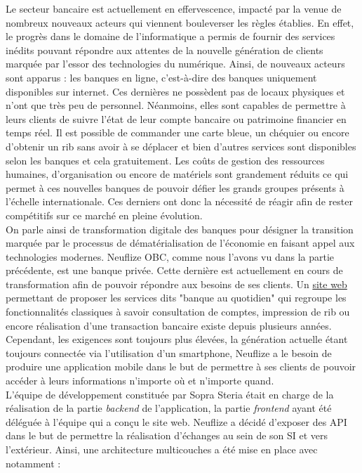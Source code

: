 	Le secteur bancaire est actuellement en effervescence, impacté par la venue de nombreux nouveaux acteurs qui viennent bouleverser les règles établies. En effet, le progrès dans le domaine de l'informatique a permis de fournir des services inédits pouvant répondre aux attentes de la nouvelle génération de clients marquée par l'essor des technologies du numérique. Ainsi, de nouveaux acteurs sont apparus : les banques en ligne, c'est-à-dire des banques uniquement disponibles sur internet. Ces dernières ne possèdent pas de locaux physiques et n'ont que très peu de personnel. Néanmoins, elles sont capables de permettre à leurs clients de suivre l'état de leur compte bancaire ou patrimoine financier en temps réel. Il est possible de commander une carte bleue, un chéquier ou encore d'obtenir un rib sans avoir à se déplacer et bien d'autres services sont disponibles selon les banques et cela gratuitement. Les coûts de gestion des ressources humaines, d'organisation ou encore de matériels sont grandement réduits ce qui permet à ces nouvelles banques de pouvoir défier les grands groupes présents à l'échelle internationale. Ces derniers ont donc la nécessité de réagir afin de rester compétitifs sur ce marché en pleine évolution. \\

	On parle ainsi de transformation digitale des banques pour désigner la transition marquée par le processus de dématérialisation de l'économie en faisant appel aux technologies modernes. Neuflize OBC, comme nous l'avons vu dans la partie précédente, est une banque privée. Cette dernière est actuellement en cours de transformation afin de pouvoir répondre aux besoins de ses clients. Un \href{https://www.neuflizeobc.net/portail/portail.jsp}{site web} permettant de proposer les services dits "banque au quotidien" qui regroupe les fonctionnalités classiques à savoir consultation de comptes, impression de rib ou encore réalisation d'une transaction bancaire existe depuis plusieurs années. Cependant, les exigences sont toujours plus élevées, la génération actuelle étant toujours connectée via l'utilisation d'un smartphone, Neuflize a le besoin de produire une application mobile dans le but de permettre à ses clients de pouvoir accéder à leurs informations n'importe où et n'importe quand. \\

	L'équipe de développement constituée par Sopra Steria était en charge de la réalisation de la partie \textit{backend} de l'application, la partie \textit{frontend} ayant été déléguée à l'équipe qui a conçu le site web. Neuflize a décidé d'exposer des API dans le but de permettre la réalisation d'échanges au sein de son SI et vers l'extérieur. Ainsi, une architecture multicouches a été mise en place avec notamment :

